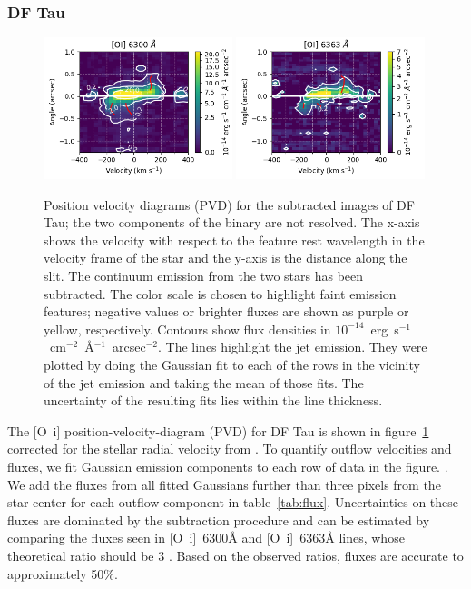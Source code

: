 \documentclass[twocolumn,trackchanges]{aastex62}
\begin{document}
\subsubsection{DF Tau}
\begin{figure}
\begin{center}
\includegraphics[width=0.49\textwidth]{DF_6300.png}
\includegraphics[width=0.49\textwidth]{DF_6363.png}
\caption{Position velocity diagrams (PVD) for the subtracted images
of DF Tau; the two components of the binary are not resolved. The x-axis
shows the velocity with respect to the feature rest wavelength in the
velocity frame of the star and the y-axis is the distance along the slit. The
continuum emission from the two stars has been subtracted. The color scale is chosen to highlight faint emission features; negative values or brighter fluxes are shown as purple or yellow, respectively. Contours show flux densities in $10^{-14}$~erg~s$^{-1}$~cm$^{-2}$~\AA{}$^{-1}$~arcsec$^{-2}$.
The  lines highlight the jet emission. They were plotted by doing the Gaussian fit to each of the rows in the vicinity of the jet emission and taking the mean of those fits. The uncertainty of the resulting fits lies within the line thickness.
\label{fig:DFTau}}
\end{center}
\end{figure}
The [O~{\sc i}] position-velocity-diagram (PVD) for DF Tau is shown in figure~\ref{fig:DFTau}
corrected for the stellar radial velocity from \citet{2006AstL...32..759G}.
To quantify outflow velocities and fluxes, we fit Gaussian emission components
to each row of data in the figure. . We add the fluxes from all fitted Gaussians further than three pixels from the star center for each outflow component
in table~\ref{tab:flux}. Uncertainties on these fluxes are dominated by the
subtraction procedure and can be estimated by comparing the fluxes seen in
[O~{\sc i}]~6300\AA{} and [O~{\sc i}]~6363\AA{} lines, whose theoretical ratio
should be 3 \citep{2000MNRAS.312..813S}. Based on the observed ratios, fluxes
are accurate to approximately 50\%.
\end{document}
